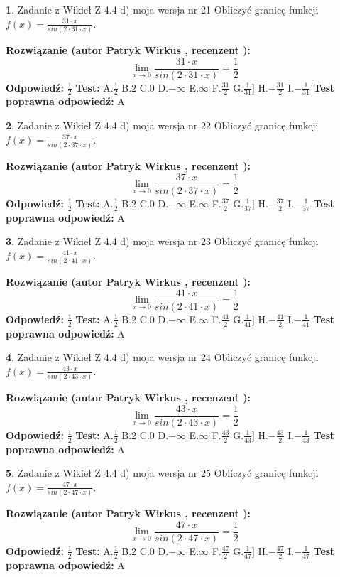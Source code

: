 \documentclass[12pt, a4paper]{article}
\theoremstyle{definition} %
\newtheorem{zad}{}
\newcommand{\zadStart}[1]{\begin{zad}#1\newline}
\newcommand{\zadStop}{\end{zad}}
\newcommand{\rozwStart}[2]{\noindent \textbf{Rozwiązanie (autor #1 , recenzent #2): }\newline}
\newcommand{\rozwStop}{\newline}
\newcommand{\odpStart}{\noindent \textbf{Odpowiedź:}\newline}
\newcommand{\odpStop}{\newline}
\newcommand{\testStart}{\noindent \textbf{Test:}\newline}
\newcommand{\testStop}{\newline}
\newcommand{\kluczStart}{\noindent \textbf{Test poprawna odpowiedź:}\newline}
\newcommand{\kluczStop}{\newline}
\begin{document}
\zadStart{Zadanie z Wikieł Z 4.4 d) moja wersja nr 21}
Obliczyć granicę funkcji $f(x)=\frac{31\cdot x}{sin(2 \cdot31\cdot x)}$.
\zadStop
\rozwStart{Patryk Wirkus}{}
$$\lim\limits_{x\to 0}\frac{31\cdot x}{sin(2 \cdot31\cdot x)}=\frac{1}{2}$$
\rozwStop
\odpStart
$\frac{1}{2}$
\odpStop
\testStart
A.$\frac{1}{2}$
B.$2$
C.$0$
D.$-\infty$
E.$\infty$
F.$\frac{31}{2}$
G.$\frac{1}{31}]$
H.$-\frac{31}{2}$
I.$-\frac{1}{31}$
\testStop
\kluczStart
A
\kluczStop



\zadStart{Zadanie z Wikieł Z 4.4 d) moja wersja nr 22}
Obliczyć granicę funkcji $f(x)=\frac{37\cdot x}{sin(2 \cdot37\cdot x)}$.
\zadStop
\rozwStart{Patryk Wirkus}{}
$$\lim\limits_{x\to 0}\frac{37\cdot x}{sin(2 \cdot37\cdot x)}=\frac{1}{2}$$
\rozwStop
\odpStart
$\frac{1}{2}$
\odpStop
\testStart
A.$\frac{1}{2}$
B.$2$
C.$0$
D.$-\infty$
E.$\infty$
F.$\frac{37}{2}$
G.$\frac{1}{37}]$
H.$-\frac{37}{2}$
I.$-\frac{1}{37}$
\testStop
\kluczStart
A
\kluczStop



\zadStart{Zadanie z Wikieł Z 4.4 d) moja wersja nr 23}
Obliczyć granicę funkcji $f(x)=\frac{41\cdot x}{sin(2 \cdot41\cdot x)}$.
\zadStop
\rozwStart{Patryk Wirkus}{}
$$\lim\limits_{x\to 0}\frac{41\cdot x}{sin(2 \cdot41\cdot x)}=\frac{1}{2}$$
\rozwStop
\odpStart
$\frac{1}{2}$
\odpStop
\testStart
A.$\frac{1}{2}$
B.$2$
C.$0$
D.$-\infty$
E.$\infty$
F.$\frac{41}{2}$
G.$\frac{1}{41}]$
H.$-\frac{41}{2}$
I.$-\frac{1}{41}$
\testStop
\kluczStart
A
\kluczStop



\zadStart{Zadanie z Wikieł Z 4.4 d) moja wersja nr 24}
Obliczyć granicę funkcji $f(x)=\frac{43\cdot x}{sin(2 \cdot43\cdot x)}$.
\zadStop
\rozwStart{Patryk Wirkus}{}
$$\lim\limits_{x\to 0}\frac{43\cdot x}{sin(2 \cdot43\cdot x)}=\frac{1}{2}$$
\rozwStop
\odpStart
$\frac{1}{2}$
\odpStop
\testStart
A.$\frac{1}{2}$
B.$2$
C.$0$
D.$-\infty$
E.$\infty$
F.$\frac{43}{2}$
G.$\frac{1}{43}]$
H.$-\frac{43}{2}$
I.$-\frac{1}{43}$
\testStop
\kluczStart
A
\kluczStop



\zadStart{Zadanie z Wikieł Z 4.4 d) moja wersja nr 25}
Obliczyć granicę funkcji $f(x)=\frac{47\cdot x}{sin(2 \cdot47\cdot x)}$.
\zadStop
\rozwStart{Patryk Wirkus}{}
$$\lim\limits_{x\to 0}\frac{47\cdot x}{sin(2 \cdot47\cdot x)}=\frac{1}{2}$$
\rozwStop
\odpStart
$\frac{1}{2}$
\odpStop
\testStart
A.$\frac{1}{2}$
B.$2$
C.$0$
D.$-\infty$
E.$\infty$
F.$\frac{47}{2}$
G.$\frac{1}{47}]$
H.$-\frac{47}{2}$
I.$-\frac{1}{47}$
\testStop
\kluczStart
A
\kluczStop
\end{document}
